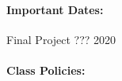 \documentclass[11pt, a4paper]{article}
\begin{document}
\paragraph{Important Dates:}
\begin{center} \begin{minipage}{3.8in}
\begin{flushleft}
Final Project    \dotfill ??? 2020\\
\end{flushleft}
\end{minipage}
\end{center}

\paragraph{Class Policies:}
\end{document}
